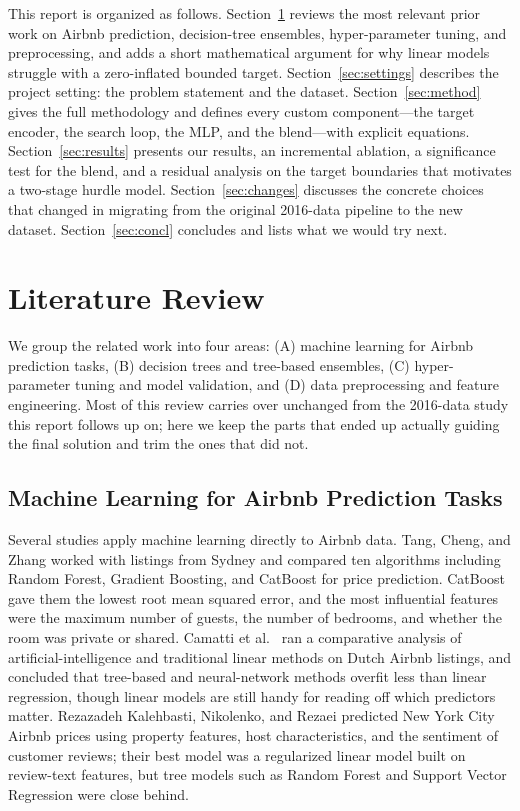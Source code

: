 \documentclass[journal]{IEEEtran}
\begin{document}
This report is organized as follows. Section~\ref{sec:lit} reviews the most
relevant prior work on Airbnb prediction, decision-tree ensembles,
hyper-parameter tuning, and preprocessing, and adds a short mathematical
argument for why linear models struggle with a zero-inflated bounded target.
Section~\ref{sec:settings} describes the project setting: the problem statement
and the dataset. Section~\ref{sec:method} gives the full methodology and
defines every custom component---the target encoder, the search loop, the MLP,
and the blend---with explicit equations. Section~\ref{sec:results} presents our
results, an incremental ablation, a significance test for the blend, and a
residual analysis on the target boundaries that motivates a two-stage hurdle
model. Section~\ref{sec:changes} discusses the concrete choices that changed in
migrating from the original 2016-data pipeline to the new dataset.
Section~\ref{sec:concl} concludes and lists what we would try next.

\section{Literature Review}
\label{sec:lit}
We group the related work into four areas: (A) machine learning for Airbnb
prediction tasks, (B) decision trees and tree-based ensembles, (C)
hyper-parameter tuning and model validation, and (D) data preprocessing and
feature engineering. Most of this review carries over unchanged from the
2016-data study this report follows up on; here we keep the parts that ended
up actually guiding the final solution and trim the ones that did not.

\subsection{Machine Learning for Airbnb Prediction Tasks}
Several studies apply machine learning directly to Airbnb data. Tang, Cheng, and
Zhang \cite{tang2024} worked with listings from Sydney and compared ten
algorithms including Random Forest, Gradient Boosting, and CatBoost for price
prediction. CatBoost gave them the lowest root mean squared error, and the most
influential features were the maximum number of guests, the number of bedrooms,
and whether the room was private or shared. Camatti et al.\ \cite{camatti2024}
ran a comparative analysis of artificial-intelligence and traditional linear
methods on Dutch Airbnb listings, and concluded that tree-based and
neural-network methods overfit less than linear regression, though linear models
are still handy for reading off which predictors matter. Rezazadeh Kalehbasti,
Nikolenko, and Rezaei \cite{kalehbasti2019} predicted New York City Airbnb
prices using property features, host characteristics, and the sentiment of
customer reviews; their best model was a regularized linear model built on
review-text features, but tree models such as Random Forest and Support Vector
Regression were close behind.
\end{document}
